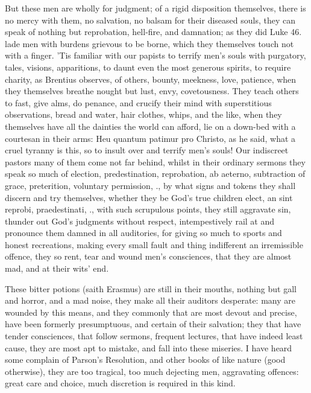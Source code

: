 {But these men are wholly for judgment; of a rigid disposition
themselves, there is no mercy with them, no salvation, no balsam for
their diseased souls, they can speak of nothing but reprobation,
hell-fire, and damnation; as they did Luke  46. lade men with
burdens grievous to be borne, which they themselves touch not with a
finger. 'Tis familiar with our papists to terrify men's souls with
purgatory, tales, visions, apparitions, to daunt even the most generous
spirits, to require charity, as Brentius observes, of others,
bounty, meekness, love, patience, when they themselves breathe nought
but lust, envy, covetousness. They teach others to fast, give alms, do
penance, and crucify their mind with superstitious observations, bread
and water, hair clothes, whips, and the like, when they themselves have
all the dainties the world can afford, lie on a down-bed with a
courtesan in their arms: Heu quantum patimur pro Christo, as he
said, what a cruel tyranny is this, so to insult over and terrify men's
souls! Our indiscreet pastors many of them come not far behind, whilst
in their ordinary sermons they speak so much of election,
predestination, reprobation, ab aeterno, subtraction of grace,
preterition, voluntary permission, \etc{}., by what signs and tokens they
shall discern and try themselves, whether they be God's true children
elect, an sint reprobi, praedestinati, \etc{}., with such scrupulous
points, they still aggravate sin, thunder out God's judgments without
respect, intempestively rail at and pronounce them damned in all
auditories, for giving so much to sports and honest recreations, making
every small fault and thing indifferent an irremissible offence, they
so rent, tear and wound men's consciences, that they are almost mad,
and at their wits' end.

These bitter potions (saith Erasmus) are still in their mouths,
nothing but gall and horror, and a mad noise, they make all their
auditors desperate: many are wounded by this means, and they commonly
that are most devout and precise, have been formerly presumptuous, and
certain of their salvation; they that have tender consciences, that
follow sermons, frequent lectures, that have indeed least cause, they
are most apt to mistake, and fall into these miseries. I have heard
some complain of Parson's Resolution, and other books of like nature
(good otherwise), they are too tragical, too much dejecting men,
aggravating offences: great care and choice, much discretion is
required in this kind.

}
